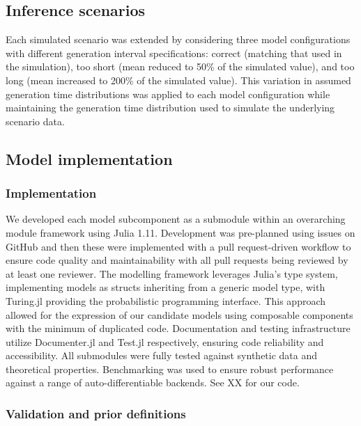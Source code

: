 \documentclass{getwriting}
\begin{document}
\subsection{Inference scenarios}

Each simulated scenario was extended by considering three model configurations with different generation interval specifications: correct (matching that used in the simulation), too short (mean reduced to 50\% of the simulated value), and too long (mean increased to 200\% of the simulated value). This variation in assumed generation time distributions was applied to each model configuration while maintaining the generation time distribution used to simulate the underlying scenario data.

\subsection{Model implementation}

\subsubsection{Implementation}

We developed each model subcomponent as a submodule within an overarching module framework using Julia 1.11. Development was pre-planned using issues on GitHub and then these were implemented with a pull request-driven workflow to ensure code quality and maintainability with all pull requests being reviewed by at least one reviewer. The modelling framework leverages Julia's type system, implementing models as structs inheriting from a generic model type, with Turing.jl providing the probabilistic programming interface. This approach allowed for the expression of our candidate models using composable components with the minimum of duplicated code. Documentation and testing infrastructure utilize Documenter.jl and Test.jl respectively, ensuring code reliability and accessibility. All submodules were fully tested against synthetic data and theoretical properties. Benchmarking was used to ensure robust performance against a range of auto-differentiable backends. See XX for our code.

\subsubsection{Validation and prior definitions}
\end{document}
